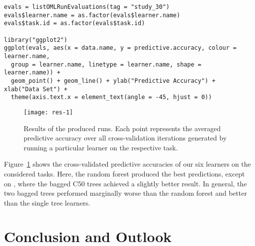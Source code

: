 \begin{knitrout}\small
{}\color{fgcolor}\begin{kframe}
\begin{verbatim}
evals = listOMLRunEvaluations(tag = "study_30")
evals$learner.name = as.factor(evals$learner.name)
evals$task.id = as.factor(evals$task.id)

library("ggplot2")
ggplot(evals, aes(x = data.name, y = predictive.accuracy, colour = learner.name, 
  group = learner.name, linetype = learner.name, shape = learner.name)) +
  geom_point() + geom_line() + ylab("Predictive Accuracy") + xlab("Data Set") +
  theme(axis.text.x = element_text(angle = -45, hjust = 0))
\end{verbatim}
\end{kframe}\begin{figure}[!h]

{\centering \texttt{[image: res-1]} 

}

\caption[Results of the produced runs]{Results of the produced runs. Each point represents the averaged predictive accuracy over all cross-validation iterations generated by running a particular learner on the respective task.}\label{fig:res}
\end{figure}


\end{knitrout}

Figure~\ref{fig:res} shows the cross-validated predictive accuracies of our six learners on the considered tasks. Here, the random forest produced the best predictions, except on , where the bagged C50 trees achieved a slightly better result. In general, the two bagged trees performed marginally worse than the random forest and better than the single tree learners.



\section{Conclusion and Outlook}
\label{sec:outlook}

